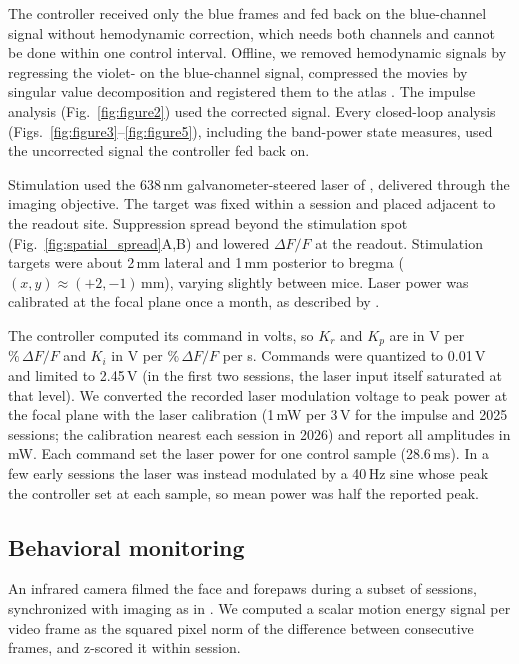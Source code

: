 The controller received only the blue frames and fed back on the blue-channel signal without hemodynamic correction, which needs both channels and cannot be done within one control interval.
Offline, we removed hemodynamic signals by regressing the violet- on the blue-channel signal, compressed the movies by singular value decomposition and registered them to the atlas \citep{Matveev2024}.
The impulse analysis (Fig.~\ref{fig:figure2}) used the corrected signal.
Every closed-loop analysis (Figs.~\ref{fig:figure3}--\ref{fig:figure5}), including the band-power state measures, used the uncorrected signal the controller fed back on.

Stimulation used the 638\,nm galvanometer-steered laser of \citet{Matveev2024}, delivered through the imaging objective.
The target was fixed within a session and placed adjacent to the readout site.
Suppression spread beyond the stimulation spot (Fig.~\ref{fig:spatial_spread}A,B) and lowered $\Delta F/F$ at the readout.
Stimulation targets were about 2\,mm lateral and 1\,mm posterior to bregma ($(x, y) \approx (+2, -1)$\,mm), varying slightly between mice.
Laser power was calibrated at the focal plane once a month, as described by \citet{Matveev2024}.

The controller computed its command in volts, so $K_r$ and $K_p$ are in V per $\%\,\Delta F/F$ and $K_i$ in V per $\%\,\Delta F/F$ per s.
Commands were quantized to 0.01\,V and limited to 2.45\,V (in the first two sessions, the laser input itself saturated at that level).
We converted the recorded laser modulation voltage to peak power at the focal plane with the laser calibration \citep{Matveev2024} (1\,mW per 3\,V for the impulse and 2025 sessions; the calibration nearest each session in 2026) and report all amplitudes in mW.
Each command set the laser power for one control sample (28.6\,ms).
In a few early sessions the laser was instead modulated by a 40\,Hz sine whose peak the controller set at each sample, so mean power was half the reported peak.

\subsection*{Behavioral monitoring}

An infrared camera filmed the face and forepaws during a subset of sessions, synchronized with imaging as in \citet{Matveev2024}.
We computed a scalar motion energy signal per video frame as the squared pixel norm of the difference between consecutive frames, and z-scored it within session.

